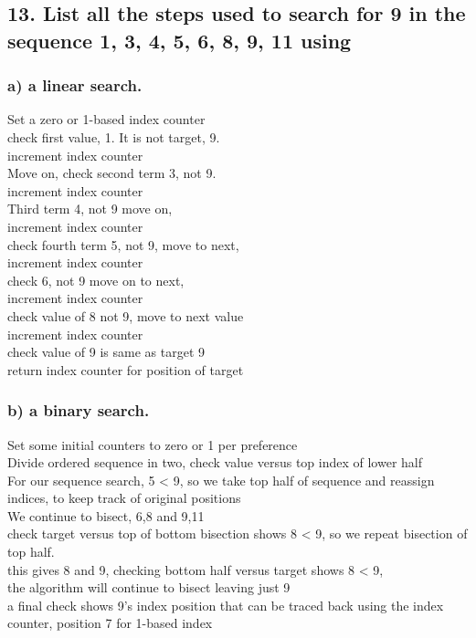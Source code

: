 \documentclass[11pt, oneside]{article} %
\numberwithin{equation}{section} %
\numberwithin{figure}{section} %
\numberwithin{table}{section} %
\begin{document}

\subsection{13. List all the steps used to search for 9 in the sequence 1, 3, 4, 5, 6, 8, 9, 11 using}
\subsubsection{a) a linear search.}
Set a zero or 1-based index counter \\
check first value, 1. It is not target, 9. \\
increment index counter \\
Move on, check second term 3, not 9. \\
increment index counter \\
Third term 4, not 9 move on, \\
increment index counter \\
check fourth term 5, not 9, move to next, \\
increment index counter \\
check 6, not 9 move on to next, \\
increment index counter \\
check value of 8 not 9, move to next value \\
increment index counter \\
check value of 9 is same as target 9 \\
return index counter for position of target
\subsubsection{b) a binary search.}
Set some initial counters to zero or 1 per preference \\
Divide ordered sequence in two,
check value versus top index of lower half \\
For our sequence search, 5 < 9, so we take top half of sequence and reassign indices, to keep track of original positions \\
We continue to bisect, 6,8 and 9,11 \\
check target versus top of bottom bisection shows 8 < 9, so we repeat bisection of top half.\\
this gives 8 and 9, checking bottom half versus target shows 8 < 9, \\
the algorithm will continue to bisect leaving just 9 \\
a final check shows 9's index position that can be traced back using the index counter, position 7 for 1-based index \\\\\\\\\\
\end{document}
